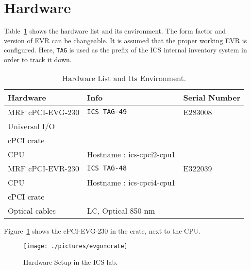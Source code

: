 \documentclass[11pt
  , a4paper
  , article
  , oneside
  , showtrims
]{memoir}
\begin{document}
\section{Hardware}
Table~\ref{table:hwlist} shows the hardware list and its environment. The form factor and version of EVR can be changeable. It is assumed that the proper working EVR is configured. Here, \texttt{TAG} is used as the prefix of the ICS internal inventory system in order to track it down.
\begin{table}[!hb]
  \centering
  \begin{tabular}{l|l|l}
    \toprule
    Hardware                  & Info                        & Serial Number \\\midrule
    MRF cPCI-EVG-230          & \texttt{ICS TAG-49}         & E283008       \\\midrule
    Universal I/O             &                             &               \\\midrule
    cPCI crate                &                             &               \\\midrule
    CPU                       & Hostname : ics-cpci2-cpu1   &               \\\midrule
    MRF cPCI-EVR-230          & \texttt{ICS TAG-48}         & E322039       \\\midrule
    CPU                       & Hostname : ics-cpci4-cpu1   &               \\\midrule
    cPCI crate                &                             &               \\\midrule
    Optical cables            & LC, Optical 850 nm          &               \\\bottomrule
  \end{tabular}
  \caption[]{Hardware List and Its Environment.}
  \label{table:hwlist}
\end{table}


Figure~\ref{fig:hw-setup} shows the cPCI-EVG-230 in the crate, next to the CPU.
\begin{figure}[!b]
  \centering
  \texttt{[image: ./pictures/evgoncrate]}
  \caption{Hardware Setup in the ICS lab.}
  \label{fig:hw-setup}   
\end{figure}


\clearpage
\end{document}
